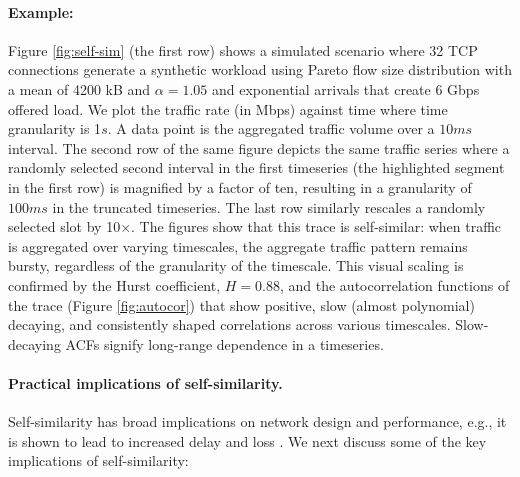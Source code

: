 \paragraph{Example:} Figure \ref{fig:self-sim} (the first row) shows a simulated scenario where 32 TCP connections generate a synthetic workload using Pareto flow size distribution with a mean of 4200 kB and $\alpha=1.05$ and exponential arrivals that create 6 Gbps offered load.
We plot the traffic rate (in Mbps) against time where time granularity is 1$s$. A data point is the aggregated traffic volume over a $10 ms$ interval. The second row of the same figure depicts the same traffic series where a randomly selected second interval in the first timeseries (the highlighted segment in the first row) is magnified by a factor of ten, resulting in a granularity of $100 ms$ in the truncated timeseries. The last row similarly rescales a randomly selected slot by 10$\times$. The figures show that this trace is self-similar: when traffic is aggregated over varying timescales, the aggregate traffic pattern remains bursty, regardless of the granularity of the timescale. 
%
This visual scaling is confirmed by the Hurst coefficient, $H=0.88$, and the autocorrelation functions of the trace (Figure \ref{fig:autocor}) that show positive, slow (almost polynomial) decaying, and consistently shaped correlations across various timescales. Slow-decaying ACFs signify long-range dependence in a timeseries.

\paragraph{Practical implications of self-similarity.}
Self-similarity has broad implications on network design and performance, e.g., it is shown to lead to increased delay and loss \cite{filesize, mts_cc, adas1995resource, addie1995fractal, duffield1995large, likhanov1995analysis, norros1994storage}. We next discuss some of the key implications of self-similarity: 

